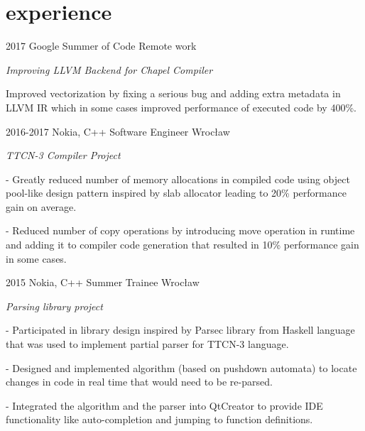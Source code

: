 \documentclass[]{twentysecondcv}
\begin{document}

\section{experience}

\begin{twenty}
  \twentyitem
    {2017}
    {Google Summer of Code}
    {Remote work}
    {
    \emph{Improving LLVM Backend for Chapel Compiler}
    
    Improved vectorization by fixing a serious bug and adding extra metadata in LLVM IR which in some cases improved performance of executed code by 400\%. 
    
    }
  \twentyitem
    {2016-2017}
    {Nokia, C++ Software Engineer}
    {Wrocław}
    {
    \emph{TTCN-3 Compiler Project}
    
     - Greatly reduced number of memory allocations in compiled code using object pool-like design pattern inspired by slab allocator leading to 20\% performance gain on average.
     
     - Reduced number of copy operations by introducing move operation in runtime and adding it to compiler code generation that resulted in 10\% performance gain in some cases. }
     
\twentyitem
    {2015}
    {Nokia, C++ Summer Trainee}
    {Wrocław}
    {
    \emph{Parsing library project}
    
    - Participated in library design inspired by Parsec library from Haskell language that was used to implement partial parser for TTCN-3 language.
    
    - Designed and implemented algorithm (based on pushdown automata) to locate changes in code in real time that would need to be re-parsed.
    
    - Integrated the algorithm and the parser into QtCreator to provide IDE functionality like auto-completion and jumping to function definitions.
    
    }

\end{twenty}
\end{document}
